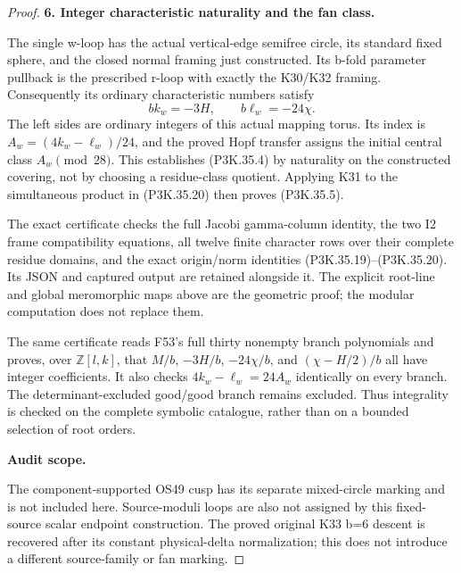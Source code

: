 \begin{proof}
\par\medskip\noindent\textbf{6. Integer characteristic naturality and the fan class.}\enspace

The single w-loop has the actual vertical-edge semifree circle,
its standard fixed sphere, and the closed normal framing just
constructed. Its b-fold parameter pullback is the prescribed
r-loop with exactly the K30/K32 framing. Consequently its
ordinary characteristic numbers satisfy
\[
 b k_w=-3H,\qquad b\ell_w=-24\chi.
\]
The left sides are ordinary integers of this actual mapping
torus. Its index is \(A_w=(4k_w-\ell_w)/24\), and the proved
Hopf transfer assigns the initial central class
\(A_w\pmod{28}\). This establishes (P3K.35.4) by naturality on
the constructed covering, not by choosing a residue-class
quotient. Applying K31 to the simultaneous product in (P3K.35.20)
then proves (P3K.35.5).

The exact certificate 
checks the full Jacobi gamma-column identity, the two I2 frame
compatibility equations, all twelve finite character rows over
their complete residue domains, and the exact origin/norm
identities (P3K.35.19)--(P3K.35.20). Its JSON and captured output are
retained alongside it. The explicit root-line and global
meromorphic maps above are the geometric proof; the modular
computation does not replace them.

The same certificate reads F53's full thirty nonempty branch
polynomials and proves, over \(\mathbb Z[l,k]\), that
\(M/b\), \(-3H/b\), \(-24\chi/b\), and
\((\chi-H/2)/b\) all have integer coefficients. It also checks
\(4k_w-\ell_w=24A_w\) identically on every branch. The
determinant-excluded good/good branch remains excluded. Thus
integrality is checked on the complete symbolic catalogue,
rather than on a bounded selection of root orders.

\par\medskip\noindent\textbf{Audit scope.}\enspace

The component-supported OS49 cusp has its separate mixed-circle
marking and is not included here. Source-moduli loops are also
not assigned by this fixed-source scalar endpoint construction.
The proved original K33 b=6 descent is recovered after its
constant physical-delta normalization; this does not introduce
a different source-family or fan marking.
\end{proof}
